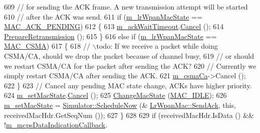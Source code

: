 \begin{DoxyCode}
609                   \textcolor{comment}{// for sending the ACK frame. A new transmission attempt will be started}
610                   \textcolor{comment}{// after the ACK was send.}
611                   \textcolor{keywordflow}{if} (\hyperlink{classns3_1_1LrWpanMac_ab5cdfd39de7397d658d300961dab3ed0}{m\_lrWpanMacState} == \hyperlink{group__lr-wpan_gga02ee7efd682937a8781f5e6101f61884ae46a1e995082569f76cb986500770ab8}{MAC\_ACK\_PENDING})
612                     \{
613                       \hyperlink{classns3_1_1LrWpanMac_aab5862bb53367634f12d0cddecc19fa8}{m\_ackWaitTimeout}.\hyperlink{classns3_1_1EventId_a993ae94e48e014e1afd47edb16db7a11}{Cancel} ();
614                       \hyperlink{classns3_1_1LrWpanMac_ab13e2a85286df14146410591f378f81d}{PrepareRetransmission} ();
615                     \}
616                   \textcolor{keywordflow}{else} \textcolor{keywordflow}{if} (\hyperlink{classns3_1_1LrWpanMac_ab5cdfd39de7397d658d300961dab3ed0}{m\_lrWpanMacState} == \hyperlink{group__lr-wpan_gga02ee7efd682937a8781f5e6101f61884a48f1c874cba8ef8b6332e9bd59e1341f}{MAC\_CSMA})
617                     \{
618                       \textcolor{comment}{// \(\backslash\)todo: If we receive a packet while doing CSMA/CA, should  we drop the packet
       because of channel busy,}
619                       \textcolor{comment}{//        or should we restart CSMA/CA for the packet after sending the ACK?}
620                       \textcolor{comment}{// Currently we simply restart CSMA/CA after sending the ACK.}
621                       \hyperlink{classns3_1_1LrWpanMac_a03fc5a3a267a984f8ec0ba62ff9da270}{m\_csmaCa}->Cancel ();
622                     \}
623                   \textcolor{comment}{// Cancel any pending MAC state change, ACKs have higher priority.}
624                   \hyperlink{classns3_1_1LrWpanMac_a764e1cada16e9fc51d9863963d962823}{m\_setMacState}.\hyperlink{classns3_1_1EventId_a993ae94e48e014e1afd47edb16db7a11}{Cancel} ();
625                   \hyperlink{classns3_1_1LrWpanMac_a9218b72b6b4326ae606de4a74a82ab6d}{ChangeMacState} (\hyperlink{group__lr-wpan_gga02ee7efd682937a8781f5e6101f61884a091c013ccdbce1011c1a4e141b227730}{MAC\_IDLE});
626                   \hyperlink{classns3_1_1LrWpanMac_a764e1cada16e9fc51d9863963d962823}{m\_setMacState} = \hyperlink{classns3_1_1Simulator_a2219ee02c0647adc83d1c918c3256266}{Simulator::ScheduleNow} (&
      \hyperlink{classns3_1_1LrWpanMac_afdf2ca2fc6e15fbb1767720607a101f8}{LrWpanMac::SendAck}, \textcolor{keyword}{this}, receivedMacHdr.GetSeqNum ());
627                 \}
628 
629               \textcolor{keywordflow}{if} (receivedMacHdr.IsData () && !\hyperlink{classns3_1_1LrWpanMac_ada2124716389b849b2a1f9c8ff64d597}{m\_mcpsDataIndicationCallback}.

\end{DoxyCode}
